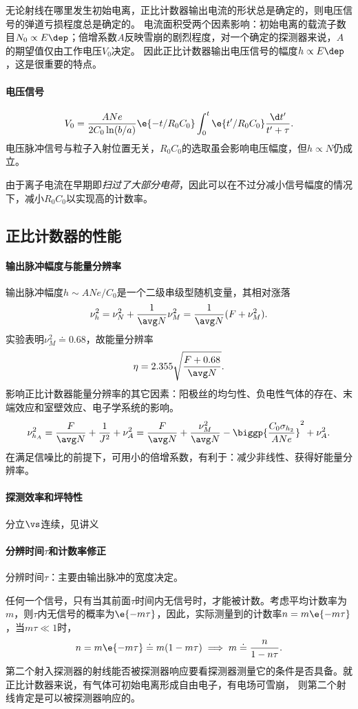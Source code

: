 无论射线在哪里发生初始电离，正比计数器输出电流的形状总是确定的，则电压信号的弹道亏损程度总是确定的。
电流面积受两个因素影响：初始电离的载流子数目$N_0\propto E\dep$；倍增系数$A$反映雪崩的剧烈程度，对一个确定的探测器来说，$A$的期望值仅由工作电压$V_0$决定。
因此正比计数器输出电压信号的幅度$h\propto E\dep$，这是很重要的特点。
\paragraph{电压信号}
\[
	V_0=\frac{ANe}{2C_0\ln(b/a)}\e{-t/R_0C_0}\int_0^t\e{t'/R_0C_0}\frac{\d t'}{t'+\tau}.
\]
电压脉冲信号与粒子入射位置无关，$R_0C_0$的选取虽会影响电压幅度，但$h\propto N$仍成立。

由于离子电流在早期即\textit{扫过了大部分电荷}，因此可以在不过分减小信号幅度的情况下，减小$R_0C_0$以实现高的计数率。

\subsection{正比计数器的性能}

\paragraph{输出脉冲幅度与能量分辨率}
输出脉冲幅度$h\sim ANe/C_0$是一个二级串级型随机变量，其相对涨落
\[
	\nu_h^2=\nu_N^2+\frac1{\avg N}\nu_M^2=\frac1{\avg N}(F+\nu_M^2).
\]
实验表明$\nu_M^2\doteq 0.68$，故能量分辨率
\begin{align}
	\eta=2.355\sqrt{\frac{F+0.68}{\avg N}}.
\end{align}
影响正比计数器能量分辨率的其它因素：阳极丝的均匀性、负电性气体的存在、末端效应和室壁效应、电子学系统的影响。
\[
	\nu_{h_A}^2=\frac F{\avg N}+\frac1{J^2}+\nu_A^2=\frac F{\avg N}+\frac{\nu_M^2}{\avg N}-\biggp{\frac{C_0\sigma_{h_2}}{ANe}}^2+\nu_A^2.
\]
在满足信噪比的前提下，可用小的倍增系数，有利于：减少非线性、获得好能量分辨率。
\paragraph{探测效率和坪特性}
分立$\vs$连续，见讲义
\paragraph{分辨时间$\tau$和计数率修正}
分辨时间$\tau$：主要由输出脉冲的宽度决定。%

任何一个信号，只有当其前面$\tau$时间内无信号时，才能被计数。考虑平均计数率为$m$，则$\tau$内无信号的概率为$\e{-m\tau}$，因此，实际测量到的计数率$n=m\e{-m\tau}$，当$m\tau\ll 1$时，
\begin{align}
	n=m\e{-m\tau}\doteq m(1-m\tau)\implies m\doteq\frac n{1-n\tau}.
\end{align}
第二个射入探测器的射线能否被探测器响应要看探测器测量它的条件是否具备。就正比计数器来说，有气体可初始电离形成自由电子，有电场可雪崩，%
则第二个射线肯定是可以被探测器响应的。%


